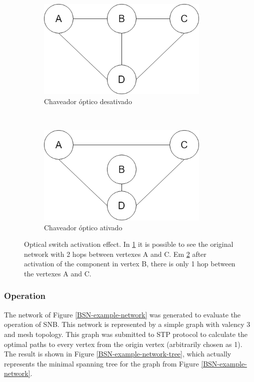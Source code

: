 \documentclass[conference]{IEEEtran}
\begin{document}
\begin{figure}[htbp]
	\centering
	\begin{subfigure}[t]{0.2\textwidth}
		\centering
		\includegraphics[width=0.9\textwidth]{./figuras/Bypass-exemplo-A.png} %
		\caption{Chaveador óptico desativado}
		\label{fig_bypass_exemplo_A}
	\end{subfigure}%
	~
	\begin{subfigure}[t]{0.2\textwidth}
		\centering
		\includegraphics[width=0.9\textwidth]{./figuras/Bypass-exemplo-B.png} %
	\caption{Chaveador óptico ativado}
	\label{fig_bypass_exemplo_B}
	\end{subfigure}
	\caption{Optical switch activation effect. In \ref{fig_bypass_exemplo_A} it is possible to see the original network with 2 hops between vertexes A and C. Em \ref{fig_bypass_exemplo_B} after activation of the component in vertex B, there is only 1 hop between the vertexes A and C. 	}
	\label{fig-bypass-exemplo}
\end{figure}

\subsubsection{Operation}
The network of Figure \ref{BSN-example-network} was generated to evaluate the operation of SNB. This network is represented by a simple graph with valency 3 and mesh topology. This graph was submitted to STP protocol to calculate the optimal paths to every vertex from the origin vertex (arbitrarily chosen as 1). The result is shown in Figure \ref{BSN-example-network-tree}, which actually represents the minimal spanning tree for the graph from Figure \ref{BSN-example-network}.
\end{document}

